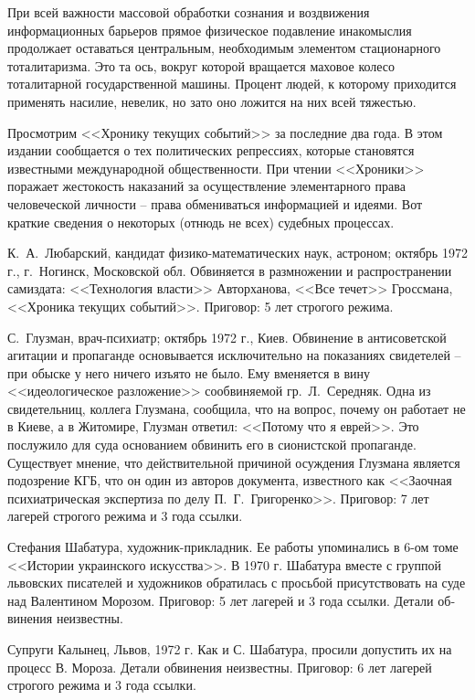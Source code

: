 \documentclass{book}
\begin{document}
При всей важности массовой обработки сознания и воздвижения информационных барьеров прямое физическое подавление инакомыслия 
продолжает оставаться центральным, необходимым элементом стационарного тоталитаризма. Это та ось, вокруг которой вращается 
маховое колесо тоталитарной государственной машины. Процент людей, к которому приходится применять насилие, невелик, но зато оно 
ложится на них всей тяжестью.

Просмотрим <<Хронику текущих событий>> за последние два года. В этом издании сообщается о тех политических репрессиях, которые 
становятся известными международной общественности. При чтении <<Хроники>> поражает жестокость наказаний за осуществление 
элементарного права человеческой личности -- права обмениваться информацией и идеями. Вот краткие сведения о некоторых (отнюдь 
не всех) судебных процессах.

К.~А.~Любарский, кандидат физико-математических наук, астроном; октябрь 1972 г., г.~Ногинск, Московской обл. Обвиняется в 
размножении и распространении самиздата: <<Технология власти>> Авторханова, <<Все течет>> Гроссмана, <<Хроника текущих событий>>. 
Приговор: 5 лет строгого режима.

С.~Глузман, врач-психиатр; октябрь 1972 г., Киев. Обвинение в антисоветской агитации и пропаганде основывается исклю­чительно на 
показаниях свидетелей -- при обыске у него ничего изъято не было. Ему вменяется в вину <<идеологическое разложение>> сообвиняемой 
гр.~Л.~Середняк. Одна из свидетельниц, коллега Глузмана, сообщила, что на вопрос, почему он работает не в Киеве, а в Житомире, 
Глузман ответил: <<Потому что я еврей>>. Это послужило для суда основанием обвинить его в сионистской пропаганде. Существует 
мнение, что действительной причиной осуждения Глузмана является подозрение КГБ, что он один из авторов документа, известного как 
<<Заочная психиатрическая экспертиза по делу П.~Г.~Григоренко>>. Приговор: 7 лет лагерей строгого режима и 3 года ссылки.

Стефания Шабатура, художник-прикладник. Ее работы упоминались в 6-ом томе <<Истории украинского искусства>>. В 1970 г. Шабатура 
вместе с группой львовских писателей и художников обратилась с просьбой присутствовать на суде над Валентином Морозом. Приговор: 
5 лет лагерей и 3 года ссылки. Детали об­винения неизвестны.

Супруги Калынец, Львов, 1972 г. Как и С. Шабатура, просили допустить их на процесс В. Мороза. Детали обвинения неиз­вестны. 
Приговор: 6 лет лагерей строгого режима и 3 года ссылки.
\end{document}
